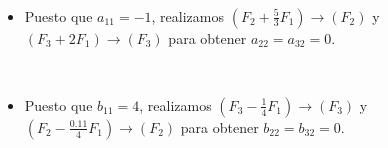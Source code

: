 \documentclass[
	spanish,
	8pt,
	utf8,
	xcolor=table,
	handout,
	aspectratio=169,
	professionalfonts,
	mathserif,
	leqno,
]{beamer}
\begin{document}
\begin{frame}
\begin{solution}
		\

		\begin{itemize}
			\item

			      Puesto que $a_{11}=-1$, realizamos
			      $\left(F_{2}+\frac{5}{3}F_{1}\right)\to\left(F_{2}\right)$
			      y $\left(F_{3}+2F_{1}\right)\to\left(F_{3}\right)$ para
			      obtener $a_{22}=a_{32}=0$.

			      \

			\item

			      Puesto que $b_{11}=4$, realizamos
			      \begin{math}
				      \left(F_{3}-\frac{1}{4}F_{1}\right)\to
				      \left(F_{3}\right)
			      \end{math}
			      y
			      \begin{math}
				      \left(F_{2}-\frac{0.11}{4}F_{1}\right)\to
				      \left(F_{2}\right)
			      \end{math}
			      para obtener
			      $b_{22}=b_{32}=0$.
		\end{itemize}
	\end{solution}
\end{frame}
\end{document}
